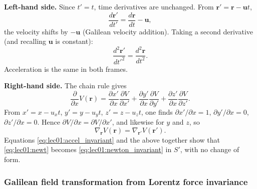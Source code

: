 \noindent\textbf{Left-hand side.}
Since $t' = t$, time derivatives are unchanged.  From
$\mathbf{r}' = \mathbf{r} - \mathbf{u} t$,
\begin{equation}
  \frac{d\mathbf{r}'}{dt'} = \frac{d\mathbf{r}}{dt} - \mathbf{u},
  \label{eq:lec01:velocity-transform}
\end{equation}
the velocity shifts by $-\mathbf{u}$ (Galilean velocity addition).
Taking a second derivative (and recalling $\mathbf{u}$ is constant):
\begin{equation}
  \frac{d^2\mathbf{r}'}{dt'^2} = \frac{d^2\mathbf{r}}{dt^2}.
  \label{eq:lec01:accel_invariant}
\end{equation}
Acceleration is the same in both frames.

\noindent\textbf{Right-hand side.}
The chain rule gives
\begin{equation}
  \frac{\partial}{\partial x} V(\mathbf{r})
  = \frac{\partial x'}{\partial x}\frac{\partial V}{\partial x'}
  + \frac{\partial y'}{\partial x}\frac{\partial V}{\partial y'}
  + \frac{\partial z'}{\partial x}\frac{\partial V}{\partial z'}.
  \label{eq:lec01:chain-rule-potential}
\end{equation}
From $x' = x - u_x t$, $y' = y - u_y t$, $z' = z - u_z t$, one
finds $\partial x'/\partial x = 1$, $\partial y'/\partial x = 0$,
$\partial z'/\partial x = 0$.  Hence
$\partial V/\partial x = \partial V/\partial x'$, and likewise
for $y$ and $z$, so
\begin{equation}
  \nabla_{\mathbf{r}} V(\mathbf{r}) = \nabla_{\mathbf{r}'} V(\mathbf{r}').
  \label{eq:lec01:gradient-invariant}
\end{equation}
Equations \eqref{eq:lec01:accel_invariant} and the above together show
that \eqref{eq:lec01:newt} becomes \eqref{eq:lec01:newton_invariant}
in $S'$, with no change of form.

\subsubsection*{Galilean field transformation from Lorentz force invariance}

